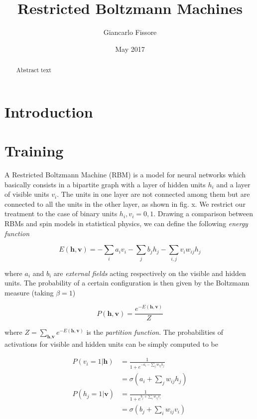 \documentclass[twocolumn]{article}
\begin{document}
\title{Restricted Boltzmann Machines}
\author{Giancarlo Fissore}
\date{May 2017}
\maketitle

\begin{abstract}
  Abstract text
\end{abstract}

\section{Introduction}

\section{Training}
A Restricted Boltzmann Machine (RBM) is a model for neural networks which basically consists in a bipartite graph with a layer of hidden units \(h_i\) and a layer of visible units \(v_i\). The units in one layer are not connected among them but are connected to all the units in the other layer, as shown in fig. x. We restrict our treatment to the case of binary units \(h_i,v_i = 0,1\). Drawing a comparison between RBMs and spin models in statistical physics, we can define the following \textit{energy function}

\begin{equation}
E(\textbf{h},\textbf{v}) = - \sum_i a_i v_i - \sum_j b_j h_j - \sum_{i,j} v_i w_{ij} h_j
\end{equation}

where \(a_i\) and \(b_i\) are \textit{external fields} acting respectively on the visible and hidden units. The probability of a certain configuration is then given by the Boltzmann measure (taking \(\beta = 1\))

\begin{equation}
P(\textbf{h},\textbf{v}) = \frac{e^{-E(\textbf{h},\textbf{v})}}{Z}
\end{equation}

where \(Z = \sum_{\textbf{h},\textbf{v}} e^{-E(\textbf{h},\textbf{v})}\) is the \textit{partition function}. The probabilities of activations for visible and hidden units can be simply computed to be

\begin{align}
P(v_i = 1 | \textbf{h}) &  = \frac{1}{1+e^{-a_i - \sum_{j} w_{ij} h_j}} \nonumber \\
& = \sigma \left(a_i + \sum_{j} w_{ij} h_j \right) \\
P(h_j = 1 | \textbf{v}) & = \frac{1}{1+e^{b_j + \sum_i w_{ij} v_i}} \nonumber \\
& = \sigma \left(b_j + \sum_i w_{ij} v_i \right)
\end{align}
\end{document}
